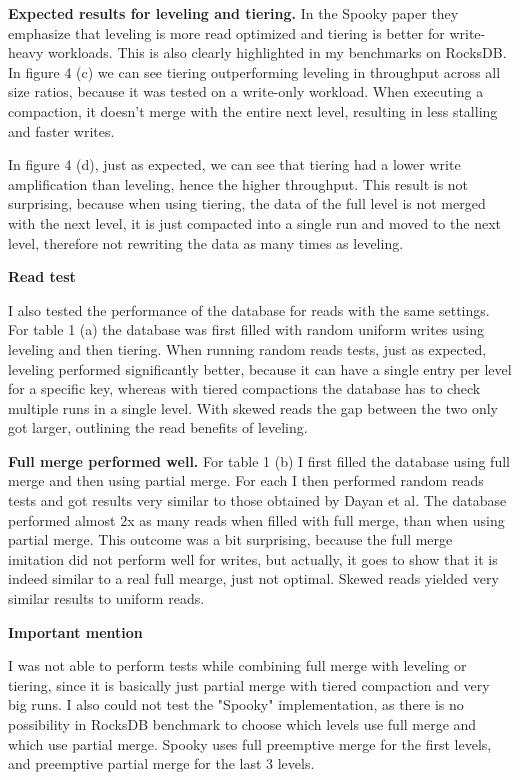 \documentclass[sigconf]{acmart}
\begin{document}
\textbf{Expected results for leveling and tiering.} In the Spooky\cite{Spooky} paper they emphasize that leveling is more read optimized and tiering is better for write-heavy workloads. This is also clearly highlighted in my benchmarks on RocksDB. In figure 4 (c) we can see tiering outperforming leveling in throughput across all size ratios, because it was tested on a write-only workload. When executing a compaction, it doesn't merge with the entire next level, resulting in less stalling and faster writes. 

In figure 4 (d), just as expected, we can see that tiering had a lower write amplification than leveling, hence the higher throughput. This result is not surprising, because when using tiering, the data of the full level is not merged with the next level, it is just compacted into a single run and moved to the next level, therefore not rewriting the data as many times as leveling.

\textbf{Read test}

I also tested the performance of the database for reads with the same settings. For table 1 (a) the database was first filled with random uniform writes using leveling and then tiering. When running random reads tests, just as expected, leveling performed significantly better, because it can have a single entry per level for a specific key, whereas with tiered compactions the database has to check multiple runs in a single level. With skewed reads the gap between the two only got larger, outlining the read benefits of leveling.

\textbf{Full merge performed well.} For table 1 (b) I first filled the database using full merge and then using partial merge. For each I then performed random reads tests and got results very similar to those obtained by Dayan et al. The database performed almost 2x as many reads when filled with full merge, than when using partial merge. This outcome was a bit surprising, because the full merge imitation did not perform well for writes, but actually, it goes to show that it is indeed similar to a real full mearge, just not optimal. Skewed reads yielded very similar results to uniform reads.

\textbf{Important mention}

I was not able to perform tests while combining full merge with leveling or tiering, since it is basically just partial merge with tiered compaction and very big runs. I also could not test the "Spooky"\cite{Spooky} implementation, as there is no possibility in RocksDB benchmark to choose which levels use full merge and which use partial merge. Spooky uses full preemptive merge for the first levels, and preemptive partial merge for the last 3 levels\cite{Spooky}.
\end{document}

